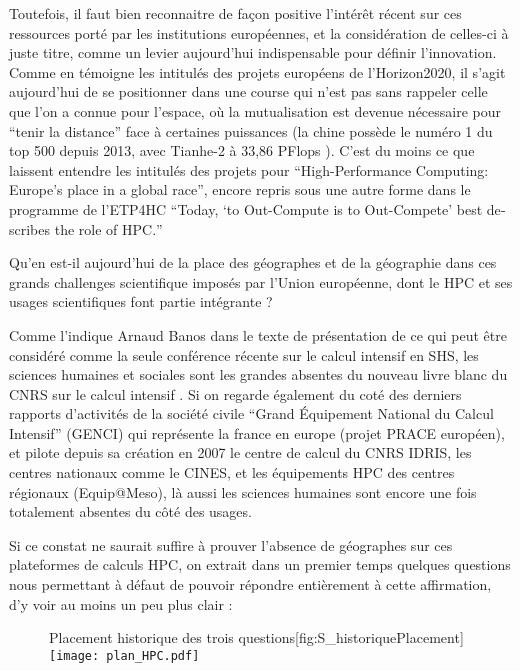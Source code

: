 Toutefois, il faut bien reconnaitre de façon positive l'intérêt récent sur ces ressources porté par les institutions européennes, et la considération de celles-ci à juste titre, comme un levier aujourd'hui indispensable pour définir l'innovation. Comme en témoigne les intitulés des projets européens de l'Horizon2020, il s'agit aujourd'hui de se positionner dans une course qui n'est pas sans rappeler celle que l'on a connue pour l'espace, où la mutualisation est devenue nécessaire pour \enquote{tenir la distance} face à certaines puissances (la chine possède le numéro 1 du top 500 depuis 2013, avec Tianhe-2 à 33,86 PFlops ). C'est du moins ce que laissent entendre les intitulés des projets pour \autocite{HPCHorizon2020} \foreignquote{english}{High-Performance Computing: Europe's place in a global race}, encore repris sous une autre forme dans le programme de l'ETP4HC \autocites{ETP4HPC2012, ETP4HPC2013} \foreignquote{english}{Today, \enquote{to Out-Compute is to Out-Compete} best describes the role of HPC.}

Qu'en est-il aujourd'hui de la place des géographes et de la géographie dans ces grands challenges scientifique imposés par l'Union européenne, dont le HPC et ses usages scientifiques font partie intégrante ?

Comme l'indique Arnaud Banos dans le texte de présentation de ce qui peut être considéré comme la seule conférence récente sur le calcul intensif en SHS, les sciences humaines et sociales sont les grandes absentes du nouveau livre blanc du CNRS sur le calcul intensif \autocite{COCIN2012}. Si on regarde également du coté des derniers rapports d'activités \autocite{GENCI2015} de la société civile \enquote{Grand Équipement National du Calcul Intensif} (GENCI)  qui représente la france en europe (projet PRACE européen), et pilote depuis sa création en 2007 le centre de calcul du CNRS IDRIS, les centres nationaux comme le CINES, et les équipements HPC des centres régionaux (Equip@Meso), là aussi les sciences humaines sont encore une fois totalement absentes du côté des usages.

Si ce constat ne saurait suffire à prouver l'absence de géographes sur ces plateformes de calculs HPC, on extrait dans un premier temps quelques questions nous permettant à défaut de pouvoir répondre entièrement à cette affirmation, d'y voir au moins un peu plus clair :

\begin{figure}[h]
\begin{sidecaption}[fortoc]{Placement historique des trois questions}[fig:S_historiquePlacement]
  \centering
 \texttt{[image: plan\_HPC.pdf]}
  \end{sidecaption}
\end{figure}

